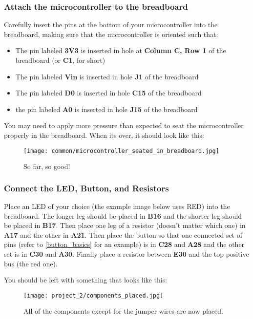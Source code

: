 \subsubsection{Attach the microcontroller to the breadboard}
Carefully insert the pins at the bottom of your microcontroller into the breadboard, making sure that the microcontroller is oriented such that:
\begin{itemize}
    \item The pin labeled \textbf{3V3} is inserted in hole at \textbf{Column C, Row 1} of the breadboard (or \textbf{C1}, for short)
    \item The pin labeled \textbf{Vin} is inserted in hole \textbf{J1} of the breadboard
    \item The pin labeled \textbf{D0} is inserted in hole \textbf{C15} of the breadboard
    \item the pin labeled \textbf{A0} is inserted in hole \textbf{J15} of the breadboard
\end{itemize}
You may need to apply more pressure than expected to seat the microcontroller properly in the breadboard. When its over, it should look like this:

\begin{figure}[H]
    \centering
    \texttt{[image: common/microcontroller\_seated\_in\_breadboard.jpg]}
    \caption{So far, so good!}
\end{figure}

\subsubsection{Connect the LED, Button, and Resistors}
Place an LED of your choice (the example image below uses RED) into the breadboard. The longer leg
should be placed in \textbf{B16} and the shorter leg should be placed in \textbf{B17}. Then place one
leg of a resistor (doesn't matter which one) in \textbf{A17} and the other in \textbf{A21}. Then place
the button so that one connected set of pins (refer to \ref{button_basics} for an example) is in \textbf{C28}
and \textbf{A28} and the other set is in \textbf{C30} and \textbf{A30}. Finally place a resistor between
\textbf{E30} and the top positive bus (the red one).

You should be left with something that looks like this:
\begin{figure}[H]
    \centering
    \texttt{[image: project\_2/components\_placed.jpg]}
    \caption{All of the components except for the jumper wires are now placed.}
\end{figure}

